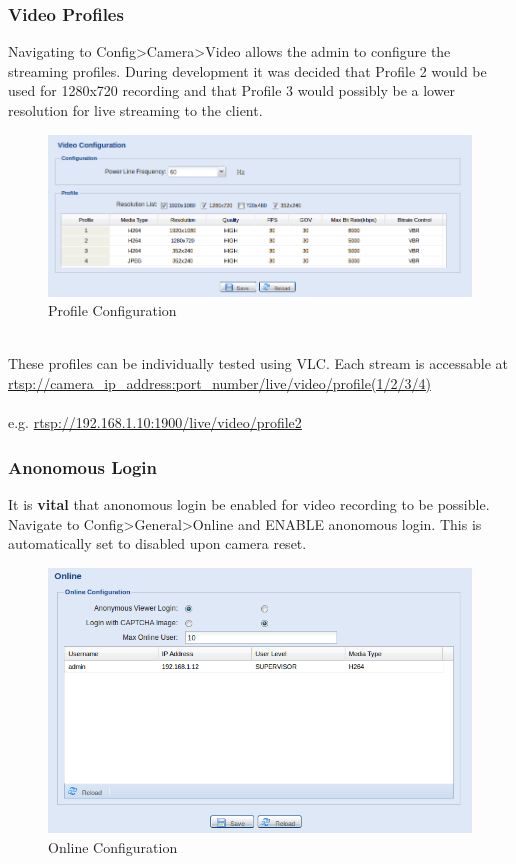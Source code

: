 \documentclass[a4paper,11pt]{report}
\begin{document}
\subsubsection{Video Profiles}
Navigating to Config>Camera>Video allows the admin to configure the streaming profiles. During development it was decided that Profile 2 would be used for 1280x720 recording and that Profile 3 would possibly be a lower resolution for live streaming to the client. 
 \begin{figure}[h]
   \begin{center}
     \includegraphics[scale=0.4]{video_config}
     \caption{Profile Configuration}
   \end{center}
 \end{figure} \\
These profiles can be individually tested using VLC. Each stream is accessable at\\ \url{rtsp://camera_ip_address:port_number/live/video/profile(1/2/3/4)}\\\\ e.g. \url{rtsp://192.168.1.10:1900/live/video/profile2}
\subsubsection{Anonomous Login}
It is \textbf{vital} that anonomous login be enabled for video recording to be possible. Navigate to Config>General>Online and ENABLE anonomous login. This is automatically set to disabled upon camera reset.
 \begin{figure}[h]
   \begin{center}
     \includegraphics[scale=0.4]{online}
     \caption{Online Configuration}
   \end{center}
 \end{figure}
\end{document}
